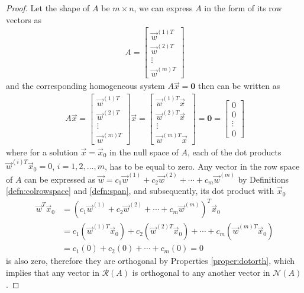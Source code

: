 \begin{proof}
Let the shape of $A$ be $m \times n$, we can express $A$ in the form of its row vectors as
\begin{align*}
A = 
\left[\begin{array}{c}
\vec{w}^{(1)T} \\
\hline
\vec{w}^{(2)T}\\
\hline
\vdots \\
\hline
\vec{w}^{(m)T}
\end{array}\right]
\end{align*}
and the corresponding homogeneous system $A\vec{x} = \textbf{0}$ then can be written as
\begin{align*}
A\vec{x} =
\left[\begin{array}{c}
\vec{w}^{(1)T} \\
\hline
\vec{w}^{(2)T}\\
\hline
\vdots \\
\hline
\vec{w}^{(m)T}
\end{array}\right]
\vec{x}
=
\left[\begin{array}{c}
\vec{w}^{(1)T}\vec{x} \\
\vec{w}^{(2)T}\vec{x} \\
\vdots \\
\vec{w}^{(m)T}\vec{x}
\end{array}\right]
= \textbf{0}
=
\left[\begin{array}{c}
0 \\
0 \\
\vdots \\
0
\end{array}\right]
\end{align*}
where for a solution $\vec{x} = \vec{x}_0$ in the null space of $A$, each of the dot products $\vec{w}^{(i)T}\vec{x}_0 = 0$, $i = 1, 2, \ldots, m$, has to be equal to zero. Any vector in the row space of $A$ can be expressed as $\vec{w} = c_1\vec{w}^{(1)} + c_2\vec{w}^{(2)} + \cdots + c_m\vec{w}^{(m)}$ by Definitions \ref{defn:colrowspace} and \ref{defn:span}, and subsequently, its dot product with $\vec{x}_0$
\begin{align*}
\vec{w}^T\vec{x}_0 &= (c_1\vec{w}^{(1)} + c_2\vec{w}^{(2)} + \cdots + c_m\vec{w}^{(m)})^T\vec{x}_0 \\
&= c_1(\vec{w}^{(1)T}\vec{x}_0) + c_2(\vec{w}^{(2)T}\vec{x}_0) + \cdots + c_m(\vec{w}^{(m)T}\vec{x}_0) \\
&= c_1(0) + c_2(0) + \cdots + c_m(0) = 0
\end{align*}
is also zero, therefore they are orthogonal by Properties \ref{proper:dotorth}, which implies that any vector in $\mathcal{R}(A)$ is orthogonal to any another vector in $\mathcal{N}(A)$.
\end{proof}
